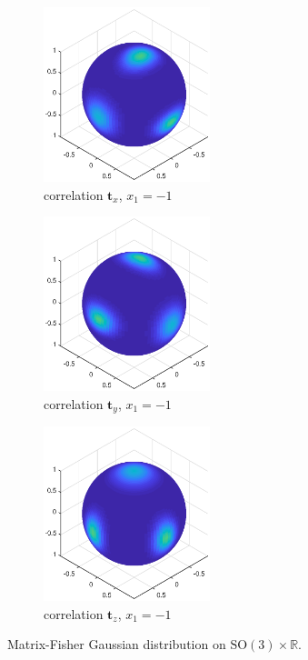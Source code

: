\documentclass[12pt]{article}
\begin{document}
\begin{figure}
	\begin{subfigure}{0.3\textwidth}
		\centering
		\includegraphics[height=2in]{x-1}
		\caption{correlation $\bm{t}_x$, $x_1=-1$}
	\end{subfigure}
	\begin{subfigure}{0.3\textwidth}
		\centering
		\includegraphics[height=2in]{y-1}
		\caption{correlation $\bm{t}_y$, $x_1=-1$}
	\end{subfigure}
	\begin{subfigure}{0.3\textwidth}
		\centering
		\includegraphics[height=2in]{z-1}
		\caption{correlation $\bm{t}_z$, $x_1=-1$}
	\end{subfigure}
	
	\caption{Matrix-Fisher Gaussian distribution on $\mathrm{SO}(3)\times\mathbb{R}$. \label{fig:SO3Correlation}}
\end{figure}
\end{document}
